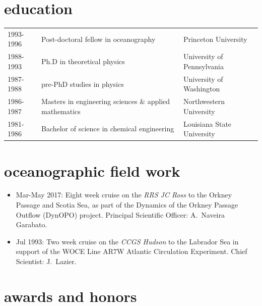 \documentclass{article}
\begin{document}
\section*{\sc \color{Maroon} education}
\vspace{-.25cm}
\begin{tabular}{lll}
1993-1996  &  Post-doctoral fellow in oceanography  & Princeton University \\
1988-1993  &  Ph.D in theoretical physics  & University of Pennsylvania \\
1987-1988  &  pre-PhD studies in physics & University of Washington\\
1986-1987  &  Masters in engineering sciences \& applied mathematics   & Northwestern University\\
1981-1986  &  Bachelor of science in chemical engineering  & Louisiana State University 
\end{tabular}


\section*{\sc \color{Maroon}  oceanographic field work}
\vspace{-.25cm}

\begin{itemize}[leftmargin=*]
 \item 
 Mar-May 2017: Eight week cruise on the {\it RRS JC Ross}  to the Orkney Passage and Scotia Sea,
  as part of the
  Dynamics of the Orkney Passage Outflow (DynOPO) project. Principal Scientific Officer: A.\ Naveira Garabato. 
 \item 
  Jul 1993: Two week cruise on the {\it CCGS Hudson} to the Labrador Sea in support of  the WOCE Line AR7W Atlantic Circulation Experiment. Chief Scientist: J.\ Lazier.
\end{itemize}


\section*{\sc  \color{Maroon}   awards and honors}
\vspace{-.25cm}
\end{document}
